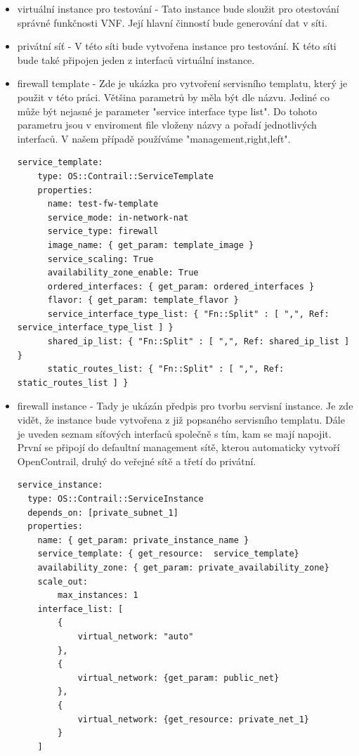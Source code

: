 \begin{itemize}

\item virtuální instance pro testování - Tato instance bude sloužit pro otestování správné funkčnosti VNF. Její hlavní činností bude generování dat v síti.

\item privátní síť - V této síti bude vytvořena instance pro testování. K této síti bude také připojen jeden z interfaců virtuální instance.

\item firewall template - Zde je ukázka pro vytvoření servisního templatu, který je použit v této práci. Většina parametrů by měla být dle názvu. Jediné co může být nejasné je parameter "service interface type list". Do tohoto parametru jsou v enviroment file vloženy názvy a pořadí jednotlivých interfaců. V našem případě používáme "management,right,left".

\begin{lstlisting}[caption=Servisní template]
service_template:
    type: OS::Contrail::ServiceTemplate
    properties:
      name: test-fw-template
      service_mode: in-network-nat
      service_type: firewall
      image_name: { get_param: template_image }
      service_scaling: True
      availability_zone_enable: True
      ordered_interfaces: { get_param: ordered_interfaces }
      flavor: { get_param: template_flavor }
      service_interface_type_list: { "Fn::Split" : [ ",", Ref: service_interface_type_list ] }
      shared_ip_list: { "Fn::Split" : [ ",", Ref: shared_ip_list ] }
      static_routes_list: { "Fn::Split" : [ ",", Ref: static_routes_list ] }
\end{lstlisting}

\item firewall instance - Tady je ukázán předpis pro tvorbu servisní instance. Je zde vidět, že instance bude vytvořena z již popsaného servisního templatu. Dále je uveden seznam síťových interfaců společně s tím, kam se mají napojit. První se připojí do defaultní management sítě, kterou automaticky vytvoří OpenContrail, druhý do veřejné sítě a třetí do privátní.

\begin{lstlisting}[caption=Servisní instance]
service_instance:
  type: OS::Contrail::ServiceInstance
  depends_on: [private_subnet_1]
  properties:
    name: { get_param: private_instance_name }
    service_template: { get_resource:  service_template}
    availability_zone: { get_param: private_availability_zone}
    scale_out: 
        max_instances: 1
    interface_list: [
        {
            virtual_network: "auto"
        },
        {
            virtual_network: {get_param: public_net}
        },
        {
            virtual_network: {get_resource: private_net_1}
        }
    ]
\end{lstlisting}


\end{itemize}
